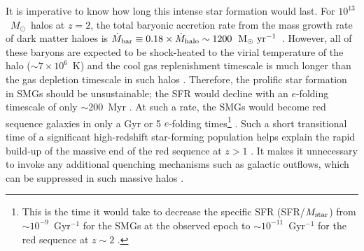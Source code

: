 \documentclass[iop,revtex4,twocolumn,apj,numberedappendix,appendixfloats]{emulateapj}
\newcommand{\ms}{$M_{\rm star}$}
\newcommand{\mg}{$M_{\rm gas}$}
\newcommand{\msun}{$M_{\odot}$}
\newcommand{\msunyr}{${\rm M}_{\odot}~{\rm yr}^{-1}$}
\begin{document}
It is imperative to know how long this intense star formation would last. For $10^{13}$~\msun\ halos at $z = 2$, the total baryonic accretion rate from the mass growth rate of dark matter haloes is $\dot{M}_{\rm bar} \equiv 0.18 \times \dot{M}_{\rm halo} \sim 1200$~\msunyr\ \citep{Neistein08}. However, all of these baryons are expected to be shock-heated to the virial temperature of the halo ($\sim7\times10^6$~K) and the cool gas replenishment timescale is much longer than the gas depletion timescale in such halos \citep[e.g.,][]{Dekel06,Tacchella15}. Therefore, the prolific star formation in SMGs should be unsustainable; the SFR would decline with an $e$-folding timescale of only $\sim$200~Myr \citep[2\mg/SFR; e.g.,][]{Tacconi08,Bothwell12}. At such a rate, the SMGs would become red sequence galaxies in only a Gyr or 5 $e$-folding times\footnote{This is the time it would take to decrease the specific SFR (SFR/\ms) from $\sim$$10^{-9}$~Gyr$^{-1}$ for the SMGs at the observed epoch to $\sim$$10^{-11}$~Gyr$^{-1}$ for the red sequence at $z \sim 2$ \citep{Brammer09}.} \citep{Fu13}. Such a short transitional time of a significant high-redshift star-forming population helps explain the rapid build-up of the massive end of the red sequence at $z > 1$ \citep[e.g.,][]{Ilbert13}. It makes it unnecessary to invoke any additional quenching mechanisms such as galactic outflows, which can be suppressed in such massive halos \citep[e.g.,][]{Singh16}. 
\end{document}
